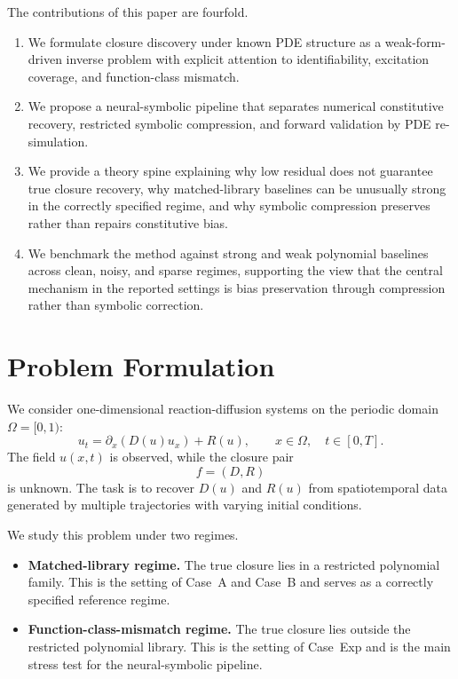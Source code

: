 \documentclass[preprint,12pt]{elsarticle}
\begin{document}
The contributions of this paper are fourfold.
\begin{enumerate}[leftmargin=1.5em]
\item We formulate closure discovery under known PDE structure as a weak-form-driven inverse problem with explicit attention to identifiability, excitation coverage, and function-class mismatch.
\item We propose a neural-symbolic pipeline that separates numerical constitutive recovery, restricted symbolic compression, and forward validation by PDE re-simulation.
\item We provide a theory spine explaining why low residual does not guarantee true closure recovery, why matched-library baselines can be unusually strong in the correctly specified regime, and why symbolic compression preserves rather than repairs constitutive bias.
\item We benchmark the method against strong and weak polynomial baselines across clean, noisy, and sparse regimes, supporting the view that the central mechanism in the reported settings is bias preservation through compression rather than symbolic correction.
\end{enumerate}

\section{Problem Formulation}

We consider one-dimensional reaction-diffusion systems on the periodic domain $\Omega = [0,1)$:
\begin{equation}
u_t = \partial_x \left( D(u) u_x \right) + R(u),
\qquad x \in \Omega, \quad t \in [0,T].
\end{equation}
The field $u(x,t)$ is observed, while the closure pair
\begin{equation}
f = (D,R)
\end{equation}
is unknown. The task is to recover $D(u)$ and $R(u)$ from spatiotemporal data generated by multiple trajectories with varying initial conditions.

We study this problem under two regimes.
\begin{itemize}[leftmargin=1.5em]
\item \textbf{Matched-library regime.} The true closure lies in a restricted polynomial family. This is the setting of Case~A and Case~B and serves as a correctly specified reference regime.
\item \textbf{Function-class-mismatch regime.} The true closure lies outside the restricted polynomial library. This is the setting of Case~Exp and is the main stress test for the neural-symbolic pipeline.
\end{itemize}
\end{document}
